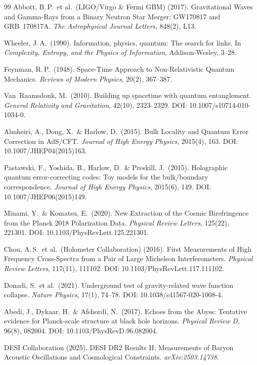 \documentclass[11pt,a4paper]{article}
\begin{document}
\begin{thebibliography}{99}
Abbott, B.\,P.\ et al.\ (LIGO/Virgo \& Fermi GBM) (2017).
Gravitational Waves and Gamma-Rays from a Binary Neutron Star Merger: GW170817 and GRB~170817A.
\textit{The Astrophysical Journal Letters}, 848(2), L13.

Wheeler, J.\,A.\ (1990).
Information, physics, quantum: The search for links.
In \textit{Complexity, Entropy, and the Physics of Information}, Addison-Wesley, 3--28.

Feynman, R.\,P.\ (1948).
Space-Time Approach to Non-Relativistic Quantum Mechanics.
\textit{Reviews of Modern Physics}, 20(2), 367--387.

Van~Raamsdonk, M.\ (2010).
Building up spacetime with quantum entanglement.
\textit{General Relativity and Gravitation}, 42(10), 2323--2329.
DOI: 10.1007/s10714-010-1034-0.

Almheiri, A., Dong, X.\ \& Harlow, D.\ (2015).
Bulk Locality and Quantum Error Correction in AdS/CFT.
\textit{Journal of High Energy Physics}, 2015(4), 163.
DOI: 10.1007/JHEP04(2015)163.

Pastawski, F., Yoshida, B., Harlow, D.\ \& Preskill, J.\ (2015).
Holographic quantum error-correcting codes: Toy models for the bulk/boundary correspondence.
\textit{Journal of High Energy Physics}, 2015(6), 149.
DOI: 10.1007/JHEP06(2015)149.

Minami, Y.\ \& Komatsu, E.\ (2020).
New Extraction of the Cosmic Birefringence from the Planck 2018 Polarization Data.
\textit{Physical Review Letters}, 125(22), 221301.
DOI: 10.1103/PhysRevLett.125.221301.

Chou, A.\,S.\ et al.\ (Holometer Collaboration) (2016).
First Measurements of High Frequency Cross-Spectra from a Pair of Large Michelson Interferometers.
\textit{Physical Review Letters}, 117(11), 111102.
DOI: 10.1103/PhysRevLett.117.111102.

Donadi, S.\ et al.\ (2021).
Underground test of gravity-related wave function collapse.
\textit{Nature Physics}, 17(1), 74--78.
DOI: 10.1038/s41567-020-1008-4.

Abedi, J., Dykaar, H.\ \& Afshordi, N.\ (2017).
Echoes from the Abyss: Tentative evidence for Planck-scale structure at black hole horizons.
\textit{Physical Review D}, 96(8), 082004.
DOI: 10.1103/PhysRevD.96.082004.

DESI Collaboration (2025).
DESI DR2 Results II: Measurements of Baryon Acoustic Oscillations and Cosmological Constraints.
\textit{arXiv:2503.14738}.


\end{thebibliography}
\end{document}
